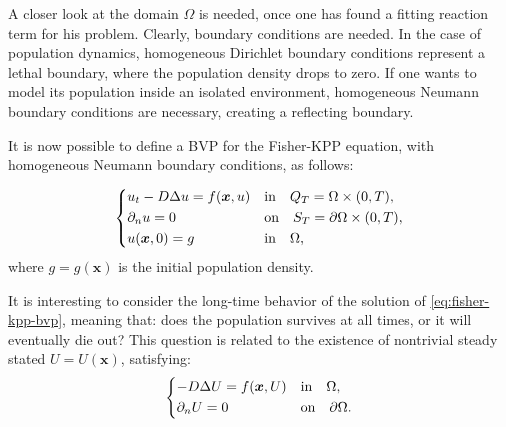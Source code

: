 A closer look at the domain \(\Omega\) is needed, once one has found a fitting reaction term for his problem. Clearly, boundary conditions are needed. In the case of population dynamics, homogeneous Dirichlet boundary conditions represent a lethal boundary, where the population density drops to zero. If one wants to model its population inside an isolated environment, homogeneous Neumann boundary conditions are necessary, creating a reflecting boundary. 

It is now possible to define a BVP for the Fisher-KPP equation, with homogeneous Neumann boundary conditions, as follows:

\begin{equation}
    \begin{dcases}
        u_t - D \Delta u = f(\bm{x}, u) & \text{in} \quad Q_T = \Omega \times (0, T), \\
        \partial_{n}u = 0 & \text{on} \quad S_T = \partial \Omega \times (0, T), \\
        u(\bm{x}, 0) = g & \text{in} \quad \Omega,
    \end{dcases}
    \label{eq:fisher-kpp-bvp}
\end{equation}
where \(g = g(\bm{x})\) is the initial population density.

It is interesting to consider the long-time behavior of the solution of \eqref{eq:fisher-kpp-bvp}, meaning that: does the population survives at all times, or it will eventually die out? This question is related to the existence of nontrivial steady stated \(U = U(\bm{x})\), satisfying:
\begin{equation}
    \begin{dcases}
        -D \Delta U = f(\bm{x}, U) & \text{in} \quad \Omega, \\
        \partial_{n}U = 0 & \text{on} \quad \partial \Omega.
    \end{dcases}
    \label{eq:fisher-kpp-steady} 
\end{equation}
